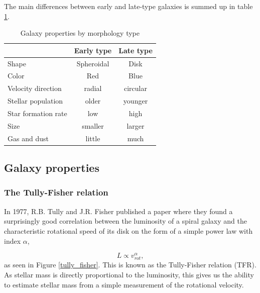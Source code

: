 The main differences between early and late-type galaxies is summed up in table \ref{morphologies}.

\begin{table}
\begin{center}
\begin{tabular} { l| c c } 
 \hline
 \hline
  & Early type & Late type \\
 \hline
 Shape & Spheroidal & Disk \\
 Color & Red & Blue \\
 Velocity direction& radial & circular \\
 Stellar population & older & younger \\
 Star formation rate & low & high \\
 Size & smaller & larger \\
 Gas and dust & little & much \\
  
 \hline 
\end{tabular}
\end{center}
\caption{Galaxy properties by morphology type}
\label{morphologies}
\end{table}

\subsection{Galaxy properties}


\subsubsection{The Tully-Fisher relation}

In 1977, R.B. Tully and J.R. Fisher \parencite{TullyFisher1977} published a paper where they found a surprisingly good correlation between the luminosity of a spiral galaxy and the characteristic rotational speed of its disk on the form of a simple power law with index $\alpha$,

\begin{equation}
    L \propto v_{rot}^\alpha,
\end{equation}
as seen in Figure \ref{tully_fisher}. This is known as the Tully-Fisher relation (TFR). As stellar mass is directly proportional to the luminosity, this gives us the ability to estimate stellar mass from a simple measurement of the rotational velocity.

